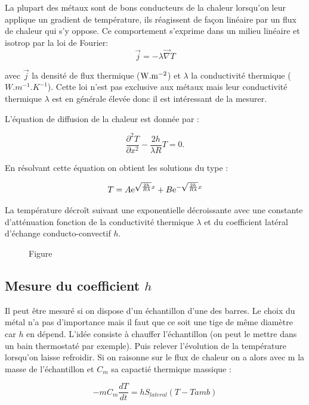\documentclass[french]{article}
\begin{document}
La plupart des métaux sont de bons conducteurs de la chaleur lorsqu'on leur applique un gradient de température, ils réagissent de façon linéaire par un flux de chaleur qui s'y oppose. Ce comportement s'exprime dans un milieu linéaire et isotrop par la loi de Fourier: 
\begin{equation}
	\vec{j} = -\lambda\vec{\nabla}T
\end{equation}

avec $\vec{j}$ la densité de flux thermique ($\rm W.m^{-2}$) et $\lambda$ la conductivité thermique ($W.m^{-1}.K^{-1}$). Cette loi n'est pas exclusive aux métaux mais leur conductivité thermique $\lambda$ est en générale élevée donc il est intéressant de la mesurer.

L'équation de diffusion de la chaleur est donnée par : 

\begin{equation}
	\dfrac{\partial^2T}{\partial x^2}-\dfrac{2h}{\lambda R}T = 0.
\end{equation}

En résolvant cette équation on obtient les solutions du type : 

\begin{equation}
	T = A{\rm e}^{\sqrt{\frac{2h}{R\lambda}}x}+B{\rm e}^{-\sqrt{\frac{2h}{R\lambda}}x}
\end{equation}

La température décroît suivant une exponentielle décroissante avec une constante d'atténuation fonction de la conductivité thermique $\lambda$ et du coefficient latéral d'échange conducto-convectif $h$.
\begin{figure}[ht]
	\centering
	\caption{Figure}
\end{figure}

\subsection{Mesure du coefficient $h$}

Il peut être mesuré si on dispose d'un échantillon d'une des barres. Le choix du métal n'a pas d'importance mais il faut que ce soit une tige de même diamètre car $h$ en dépend. L'idée consiste à chauffer l'échantillon (on peut le mettre dans un bain thermostaté par exemple). Puis relever l'évolution de la température lorsqu'on laisse refroidir. Si on raisonne sur le flux de chaleur on a alors avec m la masse de l'échantillon et $C_m$ sa capactié thermique massique : 

\begin{equation}
	-mC_m\dfrac{dT}{dt}=hS_{lateral}(T-Tamb)
\end{equation}
\end{document}
